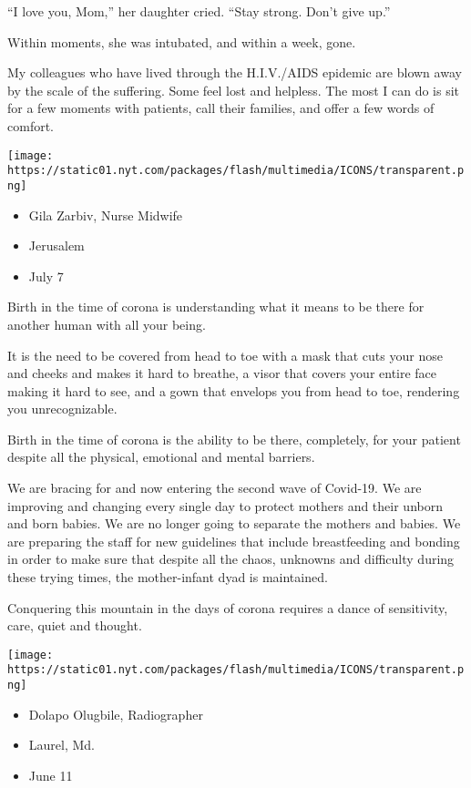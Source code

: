 ``I love you, Mom,'' her daughter cried. ``Stay strong. Don't give up.''

Within moments, she was intubated, and within a week, gone.

My colleagues who have lived through the H.I.V./AIDS epidemic are blown
away by the scale of the suffering. Some feel lost and helpless. The
most I can do is sit for a few moments with patients, call their
families, and offer a few words of comfort.

\texttt{[image: https://static01.nyt.com/packages/flash/multimedia/ICONS/transparent.png]}

\begin{itemize}
\tightlist
\item
  Gila Zarbiv, Nurse Midwife
\item
  Jerusalem
\item
  July 7
\end{itemize}

Birth in the time of corona is understanding what it means to be there
for another human with all your being.

It is the need to be covered from head to toe with a mask that cuts your
nose and cheeks and makes it hard to breathe, a visor that covers your
entire face making it hard to see, and a gown that envelops you from
head to toe, rendering you unrecognizable.

Birth in the time of corona is the ability to be there, completely, for
your patient despite all the physical, emotional and mental barriers.

We are bracing for and now entering the second wave of Covid-19. We are
improving and changing every single day to protect mothers and their
unborn and born babies. We are no longer going to separate the mothers
and babies. We are preparing the staff for new guidelines that include
breastfeeding and bonding in order to make sure that despite all the
chaos, unknowns and difficulty during these trying times, the
mother-infant dyad is maintained.

Conquering this mountain in the days of corona requires a dance of
sensitivity, care, quiet and thought.

\texttt{[image: https://static01.nyt.com/packages/flash/multimedia/ICONS/transparent.png]}

\begin{itemize}
\tightlist
\item
  Dolapo Olugbile, Radiographer
\item
  Laurel, Md.
\item
  June 11
\end{itemize}


